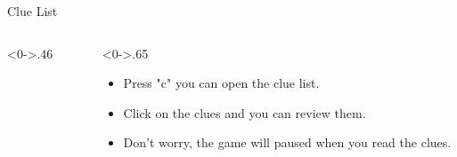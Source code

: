 \documentclass[notheorems]{beamer}
\begin{document}
\begin{framenl}{Clue List}
\begin{columns}[T] %
\begin{column}<0->{.46\textwidth}
\begin{figure}[thpb]
\centering
{}

\end{figure}
\end{column}%
\hfill%
\begin{column}<0->{.65\textwidth}
\begin{itemize}
\item<1-> Press "c" you can open the clue list.
\item<2-> Click on the clues and you can review them. 
\item<3-> Don't worry, the game will paused when you read the clues.
\end{itemize}
\end{column}%
\end{columns}
\end{framenl}
\end{document}
